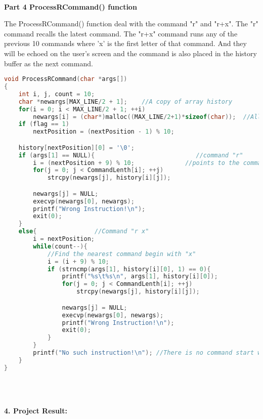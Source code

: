 \documentclass[12pt,a4paper]{article}
\begin{document}
~\\
\textbf{Part 4 ProcessRCommand() function}

The ProcessRCommand() function deal with the command "r" and "r+x". The "r" command recalls the latest command. 
The "r+x" command runs any of the previous 10 commands where 'x' is the first letter of that command. And they will be echoed on the user's screen and the command is also placed in the history buffer as the next command.

\begin{lstlisting}[language=C]
void ProcessRCommand(char *args[])
{
    int i, j, count = 10;
    char *newargs[MAX_LINE/2 + 1];    //A copy of array history
    for(i = 0; i < MAX_LINE/2 + 1; ++i)
        newargs[i] = (char*)malloc((MAX_LINE/2+1)*sizeof(char));  //Allocate the memory
    if (flag == 1)
        nextPosition = (nextPosition - 1) % 10;

    history[nextPosition][0] = '\0';
    if (args[1] == NULL){                            //command "r"
        i = (nextPosition + 9) % 10;              //points to the command to be executed
        for(j = 0; j < CommandLenth[i]; ++j)
            strcpy(newargs[j], history[i][j]);

        newargs[j] = NULL;
        execvp(newargs[0], newargs);
        printf("Wrong Instruction!\n");
        exit(0);
    }
    else{                //Command "r x"
        i = nextPosition;
        while(count--){ 
            //Find the nearest command begin with "x"
            i = (i + 9) % 10;
            if (strncmp(args[1], history[i][0], 1) == 0){
                printf("%s\t%s\n", args[1], history[i][0]);
                for(j = 0; j < CommandLenth[i]; ++j)
                    strcpy(newargs[j], history[i][j]);

                newargs[j] = NULL;
                execvp(newargs[0], newargs);
                printf("Wrong Instruction!\n");
                exit(0);
            }
        }
        printf("No such instruction!\n"); //There is no command start with "x"
    }
}
\end{lstlisting}
~\\
~\\
\begin{large}
\textbf{4. Project Result:}
\end{large}
\end{document}
